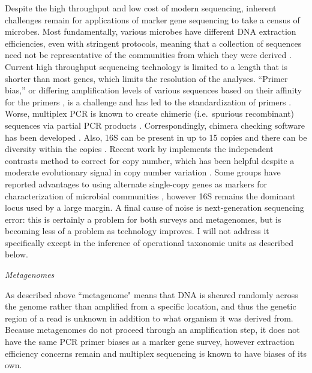 \documentclass{amsart}
\renewcommand{\subsection}[1]{%
\bigskip
\begin{center}
\begin{large}
\normalfont\itshape #1
\end{large}
\end{center}}
\begin{document}
Despite the high throughput and low cost of modern sequencing, inherent challenges remain for applications of marker gene sequencing to take a census of microbes.
Most fundamentally, various microbes have different DNA extraction efficiencies, even with stringent protocols, meaning that a collection of sequences need not be representative of the communities from which they were derived \citep{morgan2010metagenomic}.
Current high throughput sequencing technology is limited to a length that is shorter than most genes, which limits the resolution of the analyses.
``Primer bias,'' or differing amplification levels of various sequences based on their affinity for the primers \citep{suzuki1996bias,polz1998bias}, is a challenge and has led to the standardization of primers \citep{methe2012framework}.
Worse, multiplex PCR is known to create chimeric (i.e.\ spurious recombinant) sequences via partial PCR products \citep{hugenholtz2003chimeric,ashelford2005least,haas2011chimeric,schloss2011reducing}.
Correspondingly, chimera checking software has been developed \citep[including][]{ashelford2006new,edgar2011uchime}.
Also, 16S can be present in up to 15 copies and there can be diversity within the copies \citep{klappenbach2001rrndb}.
Recent work by \citet{kembel2012incorporating} implements the independent contrasts \citep{felsenstein1985phylogenies} method to correct for copy number, which has been helpful despite a moderate evolutionary signal in copy number variation \citep{klappenbach2000rrna}.
Some groups have reported advantages to using alternate single-copy genes as markers for characterization of microbial communities \citep[e.g.][]{case2007rpob,mcnabb2004hsp65}, however 16S remains the dominant locus used by a large margin.
A final cause of noise is next-generation sequencing error: this is certainly a problem for both surveys and metagenomes, but is becoming less of a problem as technology improves.
I will not address it specifically except in the inference of operational taxonomic units as described below.

\subsection{Metagenomes}
As described above ``metagenome" means that DNA is sheared randomly across the genome rather than amplified from a specific location, and thus the genetic region of a read is unknown in addition to what organism it was derived from.
Because metagenomes do not proceed through an amplification step, it does not have the same PCR primer biases as a marker gene survey, however extraction efficiency concerns remain and multiplex sequencing is known to have biases of its own.
\end{document}
